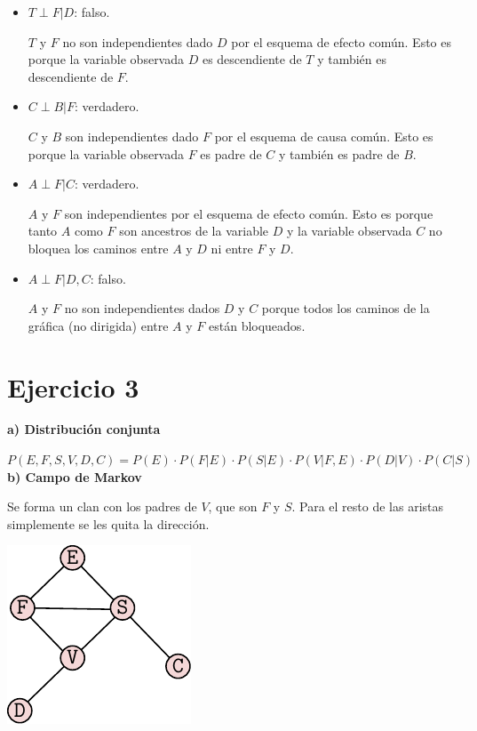\documentclass{article}
\begin{document}
\begin{itemize}

\item $T \perp F | D$: falso.

$T$ y $F$ no son independientes dado $D$ por el esquema de efecto común. Esto es porque la variable observada $D$ es descendiente de $T$ y también es descendiente de $F$.

\item $C \perp B | F$: verdadero.

$C$ y $B$ son independientes dado $F$ por el esquema de causa común. Esto es porque la variable observada $F$ es padre de $C$ y también es padre de $B$.

\item $A \perp F | C$: verdadero.

$A$ y $F$ son independientes por el esquema de efecto común. Esto es porque tanto $A$ como $F$ son ancestros de la variable $D$ y la variable observada $C$ no bloquea los caminos entre $A$ y $D$ ni entre $F$ y $D$.

\item $A \perp F | D, C$: falso.

$A$ y $F$ no son independientes dados $D$ y $C$ porque todos los caminos de la gráfica (no dirigida) entre $A$ y $F$ están bloqueados.

\end{itemize}

\section{Ejercicio 3}

\textbf{a) Distribución conjunta}

$P(E, F, S, V, D, C) = P(E) \cdot P(F | E) \cdot P(S | E) \cdot P(V | F, E) \cdot P(D | V) \cdot P(C | S)$\\

\textbf{b) Campo de Markov}

Se forma un clan con los padres de $V$, que son $F$ y $S$. Para el resto de las aristas simplemente se les quita la dirección.

\begin{center}
\includegraphics[scale=1]{ej3}
\end{center}
\end{document}
